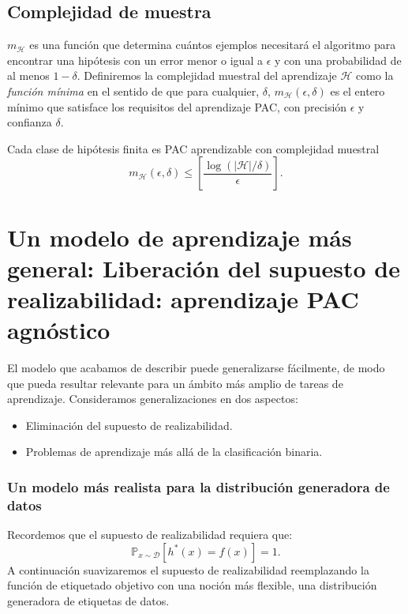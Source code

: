 \subsection{Complejidad de muestra}
$m_{\mathcal{H}}$ es una función que determina cuántos ejemplos necesitará el algoritmo para encontrar una hipótesis con un error menor o igual a $\epsilon$ y con una probabilidad de al menos $1 - \delta$. Definiremos la complejidad muestral del aprendizaje $\mathcal{H}$ como la \textit{función mínima} en el sentido de que para cualquier, $\delta$, $m_{\mathcal{H}}(\epsilon, \delta)$ es el entero mínimo que satisface los requisitos del aprendizaje PAC, con precisión $\epsilon$ y confianza $\delta$.\\

\begin{cor} Cada clase de hipótesis finita es PAC aprendizable con complejidad muestral
    $$m_{\mathcal{H}}(\epsilon, \delta) \leq \left[\dfrac{\log(|\mathcal{H}|/\delta)}{\epsilon}\right].$$
\end{cor}

\section{Un modelo de aprendizaje más general: Liberación del supuesto de realizabilidad: aprendizaje PAC agnóstico}
El modelo que acabamos de describir puede generalizarse fácilmente, de modo que pueda resultar relevante para un ámbito más amplio de tareas de aprendizaje. Consideramos generalizaciones en dos aspectos:
\begin{itemize}
    \item Eliminación del supuesto de realizabilidad.
    \item Problemas de aprendizaje más allá de la clasificación binaria.
\end{itemize}

\subsubsection{Un modelo más realista para la distribución generadora de datos}
Recordemos que el supuesto de realizabilidad requiera que:
$$\mathbb{P}_{x\sim \mathcal{D}} \left[h^*(x)=f(x)\right]=1.$$
A continuación suavizaremos el supuesto de realizabilidad reemplazando la función de etiquetado objetivo con una noción más flexible, una distribución generadora de etiquetas de datos.\\

